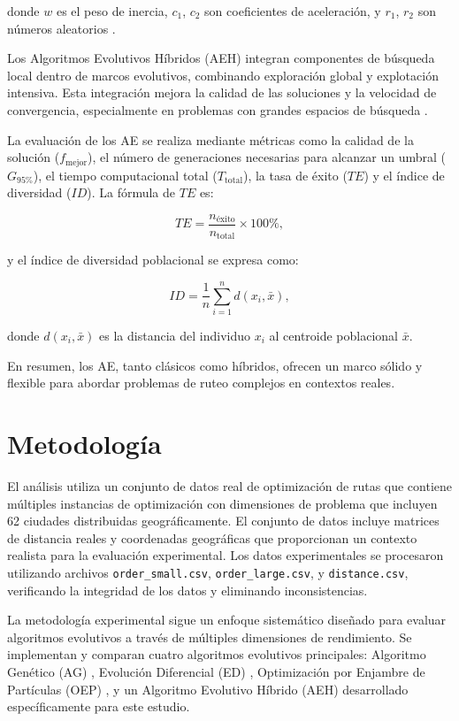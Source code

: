 \documentclass[10pt,a4paper]{article}
\begin{document}
donde $w$ es el peso de inercia, $c_1$, $c_2$ son coeficientes de aceleración, y $r_1$, $r_2$ son números aleatorios \cite{clerc2002}.

Los Algoritmos Evolutivos Híbridos (AEH) integran componentes de búsqueda local dentro de marcos evolutivos, combinando exploración global y explotación intensiva. Esta integración mejora la calidad de las soluciones y la velocidad de convergencia, especialmente en problemas con grandes espacios de búsqueda \cite{alba2013}.

La evaluación de los AE se realiza mediante métricas como la calidad de la solución ($f_{\text{mejor}}$), el número de generaciones necesarias para alcanzar un umbral ($G_{95\%}$), el tiempo computacional total ($T_{\text{total}}$), la tasa de éxito ($TE$) y el índice de diversidad ($ID$). La fórmula de $TE$ es:

\begin{equation}
TE = \frac{n_{\text{éxito}}}{n_{\text{total}}} \times 100\%,
\end{equation}

y el índice de diversidad poblacional se expresa como:

\begin{equation}
ID = \frac{1}{n} \sum_{i=1}^{n} d(x_i, \bar{x}),
\end{equation}

donde $d(x_i, \bar{x})$ es la distancia del individuo $x_i$ al centroide poblacional $\bar{x}$.

En resumen, los AE, tanto clásicos como híbridos, ofrecen un marco sólido y flexible para abordar problemas de ruteo complejos en contextos reales.

\section{Metodología}

El análisis utiliza un conjunto de datos real de optimización de rutas que contiene múltiples instancias de optimización con dimensiones de problema que incluyen 62 ciudades distribuidas geográficamente. El conjunto de datos incluye matrices de distancia reales y coordenadas geográficas que proporcionan un contexto realista para la evaluación experimental. Los datos experimentales se procesaron utilizando archivos \texttt{order\_small.csv}, \texttt{order\_large.csv}, y \texttt{distance.csv}, verificando la integridad de los datos y eliminando inconsistencias.

La metodología experimental sigue un enfoque sistemático diseñado para evaluar algoritmos evolutivos a través de múltiples dimensiones de rendimiento. Se implementan y comparan cuatro algoritmos evolutivos principales: Algoritmo Genético (AG) \cite{back1996}, Evolución Diferencial (ED) \cite{das2011}, Optimización por Enjambre de Partículas (OEP) \cite{clerc2002}, y un Algoritmo Evolutivo Híbrido (AEH) desarrollado específicamente para este estudio.
\end{document}
